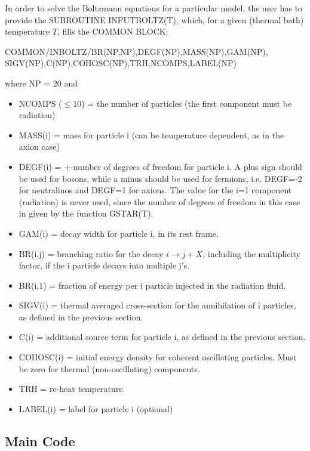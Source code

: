 \documentclass[preprint,notoc]{JHEP3}
\def\to{\rightarrow}
\def\bi{\begin{itemize}}
\def\ei{\end{itemize}}
\def\to{\rightarrow}
\begin{document}
In order to solve the Boltzmann equations for a particular model,
the user has to provide the SUBROUTINE INPUTBOLTZ(T), which, for a given (thermal bath) temperature $T$,
fills the COMMON BLOCK:
\begin{center}
	COMMON/INBOLTZ/BR(NP,NP),DEGF(NP),MASS(NP),GAM(NP),\\SIGV(NP),C(NP),COHOSC(NP),TRH,NCOMPS,LABEL(NP)
\end{center}
where NP = 20 and
\bi
\item NCOMPS ($\leq 10$) = the number of particles (the first component must be radiation)
\item MASS(i) = mass for particle i (can be temperature dependent, as in the axion case)
\item DEGF(i) = +-number of degrees of freedom for particle i. A plus sign should be used
for bosons, while a minus should be used for fermions, i.e. DEGF=-2 for neutralinos and DEGF=1 for axions. The
value for the i=1 component (radiation) is never used, since the number of degrees of freedom in this case
in given by the function GSTAR(T).
\item GAM(i) = decay width for particle i, in its rest frame.
\item BR(i,j) = branching ratio for the decay $i \to j + X$, including the multiplicity factor, if the
i particle decays into multiple j's.
\item BR(i,1) = fraction of energy per i particle injected in the radiation fluid.
\item SIGV(i) = thermal averaged cross-section for the annihilation of i particles, as defined in the previous section.
\item C(i) = additional source term for particle i, as defined in the previous section.
\item COHOSC(i) = initial energy density for coherent oscillating particles. Must be zero for thermal (non-oscillating) components.
\item TRH = re-heat temperature.
\item LABEL(i) = label for particle i (optional)
\ei


\subsection{Main Code}
\label{sec:Main}
\end{document}
